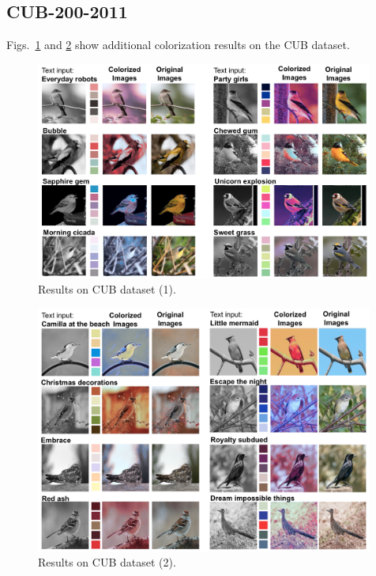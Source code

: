 \documentclass[runningheads]{llncs}
\begin{document}
\subsection{CUB-200-2011}
Figs.~\ref{fig:bird1} and \ref{fig:bird2} show additional colorization results on the CUB dataset.

\begin{figure}[h!]
\centering 
\includegraphics[width=0.99\textwidth]{./bird_supp1.png}
\vspace*{-2mm}\caption{Results on CUB dataset (1).}\label{fig:bird1}
\end{figure}

\begin{figure}[h!]
\centering 
\includegraphics[width=0.99\textwidth]{./bird_supp2.png}
\vspace*{-2mm}\caption{Results on  CUB dataset (2).}\label{fig:bird2}
\end{figure}
\end{document}
